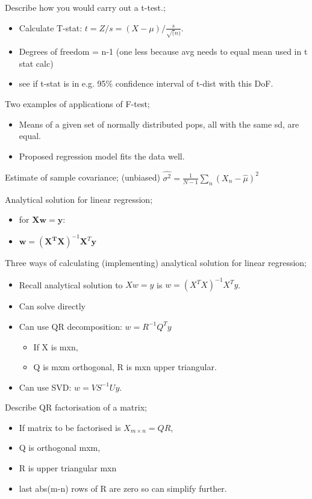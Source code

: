 \documentclass{article}
\begin{document}
Describe how you would carry out a t-test.; \begin{itemize} \item Calculate T-stat: $t=Z/s = (X-\mu)/\frac{s}{\sqrt(n)}$. \item Degrees of freedom = n-1 (one less because avg needs to equal mean used in t stat calc) \item see if t-stat is in e.g. 95\% confidence interval of t-dist with this DoF. \end{itemize}

Two examples of applications of F-test; \begin{itemize} \item Means of a given set of normally distributed pops, all with the same sd, are equal. \item Proposed regression model fits the data well. \end{itemize}

Estimate of sample covariance; (unbiased) $\hat{\sigma^2} = \frac{1}{N-1}\sum_n (X_n-\hat{\mu})^2$

Analytical solution for linear regression; \begin{itemize} \item for $\mathbf{Xw} = \mathbf{y}$: \item $\mathbf{w}=(\mathbf{X^TX})^{-1}\mathbf{X}^T\mathbf{y}$ \end{itemize} 

Three ways of calculating (implementing) analytical solution for linear regression; \begin{itemize} \item Recall analytical solution to $Xw = y$ is $w = (X^TX)^{-1}X^Ty$. \item Can solve directly \item Can use QR decomposition: $w=R^{-1}Q^Ty$ \begin{itemize} \item If X is mxn, \item Q is mxm orthogonal, R is mxn upper triangular. \end{itemize} \item Can use SVD: $w=VS^{-1}Uy$. \end{itemize}

Describe QR factorisation of a matrix; \begin{itemize} \item If matrix to be factorised is $X_{m\times n}=QR$, \item Q is orthogonal mxm, \item R is upper triangular mxn \item last abs(m-n) rows of R are zero so can simplify further.  \end{itemize}
\end{document}
